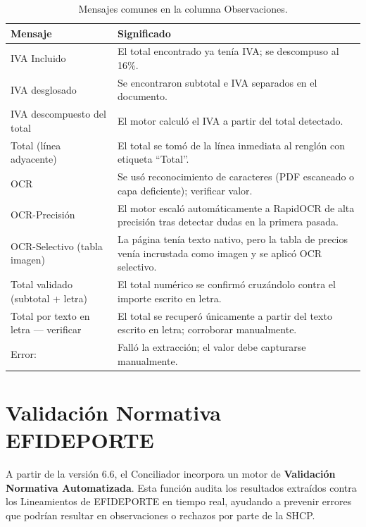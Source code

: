 \documentclass[12pt, a4paper, oneside]{report}
\begin{document}
\begin{table}[H]
  \centering
  \begin{tabularx}{\linewidth}{lX}
    \toprule
    \textbf{Mensaje} & \textbf{Significado} \\
    \midrule
    IVA Incluido             & El total encontrado ya tenía IVA; se descompuso al 16\%. \\
    IVA desglosado           & Se encontraron subtotal e IVA separados en el documento. \\
    IVA descompuesto del total & El motor calculó el IVA a partir del total detectado. \\
    Total (línea adyacente)  & El total se tomó de la línea inmediata al renglón con etiqueta ``Total''. \\
    OCR                    & Se usó reconocimiento de caracteres (PDF escaneado o capa deficiente); verificar valor. \\
    OCR-Precisión          & El motor escaló automáticamente a RapidOCR de alta precisión tras detectar dudas en la primera pasada. \\
    OCR-Selectivo (tabla imagen) & La página tenía texto nativo, pero la tabla de precios venía incrustada como imagen y se aplicó OCR selectivo. \\
    Total validado (subtotal + letra) & El total numérico se confirmó cruzándolo contra el importe escrito en letra. \\
    Total por texto en letra — verificar & El total se recuperó únicamente a partir del texto escrito en letra; corroborar manualmente. \\
    Error:                 & Falló la extracción; el valor debe capturarse manualmente. \\
    \bottomrule
  \end{tabularx}
  \caption{Mensajes comunes en la columna Observaciones.}
\end{table}

\chapter{Validación Normativa EFIDEPORTE}
\label{ch:normativa}

A partir de la versión 6.6, el Conciliador incorpora un motor de \textbf{Validación Normativa Automatizada}. Esta función audita los resultados extraídos contra los Lineamientos de EFIDEPORTE en tiempo real, ayudando a prevenir errores que podrían resultar en observaciones o rechazos por parte de la SHCP.
\end{document}
